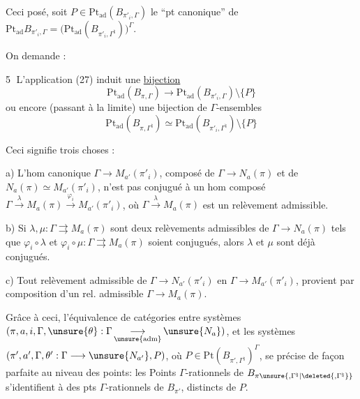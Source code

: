 Ceci posé, soit $P\in\mathrm{Pt}_{\mathrm{ad}}(B_{\pi'_i,\Gamma})$
le ``pt canonique'' de
$\mathrm{Pt}_{\mathrm{ad}}B_{\pi'_i,\Gamma}
=\bigl(\mathrm{Pt}_{\mathrm{ad}}(B_{\pi'_i,\Gamma^{\natural}})\bigr)^\Gamma$.


On demande :

\textcircled{5} L'application (27) induit une \uline{bijection}
\[
\mathrm{Pt}_{\mathrm{ad}}(B_{\pi,\Gamma})
\longrightarrow
\mathrm{Pt}_{\mathrm{ad}}(B_{\pi'_i,\Gamma})\setminus\{P\}
\]
ou encore (passant à la limite) une bijection de $\Gamma$-ensembles
\[
\mathrm{Pt}_{\mathrm{ad}}(B_{\pi,\Gamma^{\natural}})
\simeq
\mathrm{Pt}_{\mathrm{ad}}(B_{\pi'_i,\Gamma^{\natural}})\setminus\{P\}
\]

Ceci signifie trois choses :

a) L'hom canonique $\Gamma\longrightarrow M_{a'}(\pi'_i)$,
composé de $\Gamma\longrightarrow N_a(\pi)$ et de
$N_a(\pi)\simeq M_{a'}(\pi'_i)$,
n'est pas conjugué à un hom composé
$\Gamma\xrightarrow{\lambda}M_a(\pi)
\xrightarrow{\varphi_i}M_{a'}(\pi'_i)$,
où $\Gamma\xrightarrow{\lambda}M_a(\pi)$ est un relèvement admissible.

b) Si $\lambda,\mu:\Gamma\rightrightarrows M_a(\pi)$ sont deux
relèvements admissibles de $\Gamma\longrightarrow N_a(\pi)$
 tels que
$\varphi_i\circ\lambda$ et $\varphi_i\circ\mu:
\Gamma\rightrightarrows M_a(\pi)$ soient
conjugués, alors $\lambda$ et $\mu$ sont déjà
\inserted{$\pi$-}conjugués.

c) Tout relèvement admissible de
$\Gamma\longrightarrow N_{a'}(\pi'_i)$ en
$\Gamma\longrightarrow M_{a'}(\pi'_i)$,
provient par composition d'un rel. admissible
$\Gamma\longrightarrow M_a(\pi)$.


Grâce à ceci, l'équivalence de catégories entre systèmes
$(\pi,a,i,\Gamma,\unsure{\theta}:\Gamma\mathop{\longrightarrow}\limits_{\unsure{\mathrm{adm}}}\unsure{N_a})$,
et les systèmes $(\pi',a',\Gamma,\theta':\Gamma\longrightarrow\unsure{N_{a'}},P)$,
où $P\in\mathrm{Pt}(B_{\pi',\Gamma^{\natural}})^\Gamma$,
se précise de façon parfaite au niveau des points: les
Points $\Gamma$-rationnels de $B_{\pi\unsure{,\Gamma^{\natural}|\deleted{,\Gamma^{\natural}}}}$
s'identifient à 
 des pts $\Gamma$-rationnels
de $B_{\pi'}$, distincts de $P$.

